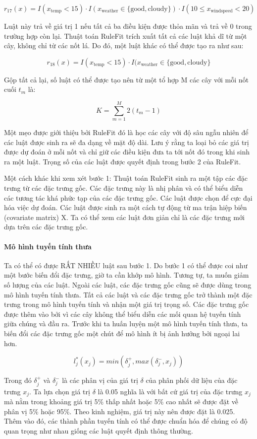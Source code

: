 $$r_{17}(x)=I(x_{\text{temp}}<15)\cdot{}I(x_{\text{weather}}\in\{\text{good},\text{cloudy}\})\cdot{}I(10\leq{}x_{\text{windspeed}}<20)$$

Luật này trả về giá trị 1 nếu tất cả ba điều kiện được thỏa mãn và trả về 0 trong trường hợp còn lại. Thuật toán RuleFit trích xuất tất cả các luật khả dĩ từ một cây, không chỉ từ các nốt lá. Do đó, một luật khác có thể được tạo ra như sau:

$$r_{18}(x)=I(x_{\text{temp}}<15)\cdot{}I(x_{\text{weather}}\in\{\text{good},\text{cloudy}\}$$

Gộp tất cả lại, số luật có thể được tạo nên từ một tổ hợp M các cây với mỗi nốt cuối $t_m$ là:

$$K=\sum_{m=1}^M2(t_m-1)$$

Một mẹo được giới thiệu bởi RuleFit đó là học các cây với độ sâu ngẫu nhiên để các luật được sinh ra sẽ đa dạng về mặt độ dài. Lưu ý rằng ta loại bỏ các giá trị được dự đoán ở mỗi nốt và chỉ giữ các điều kiện đưa ta tới nốt đó trong khi sinh ra một luật. Trọng số của các luật được quyết định trong bước 2 của RuleFit.

Một cách khác khi xem xét bước 1: Thuật toán RuleFit sinh ra một tập các đặc trưng từ các đặc trưng gốc. Các đặc trưng này là nhị phân và có thể biểu diễn các tương tác khá phức tạp của các đặc trưng gốc. Các luật được chọn để cực đại hóa việc dự đoán. Các luật được sinh ra một cách tự động từ ma trận hiệp biến (covariate matrix) X. Ta có thể xem các luật đơn giản chỉ là các đặc trưng mới dựa trên các đặc trưng gốc.


\paragraph{Mô hình tuyến tính thưa}
Ta có thể có được RẤT NHIỀU luật sau bước 1. Do bước 1 có thể được coi như một bước biến đổi đặc trưng, giờ ta cần khớp mô hình. Tương tự, ta muốn giảm số lượng của các luật. Ngoài các luật, các đặc trưng gốc cũng sẽ được dùng trong mô hình tuyến tính thưa. Tất cả các luật và các đặc trưng gốc trở thành một đặc trưng trong mô hình tuyến tính và nhận một giá trị trọng số. Các đặc trưng gốc được thêm vào bởi vì các cây không thể biểu diễn các mối quan hệ tuyến tính giữa chúng và đầu ra. Trước khi ta huấn luyện một mô hình tuyến tính thưa, ta biến đổi các đặc trưng gốc một chút để mô hình ít bị ảnh hưởng bởi ngoại lai hơn.

$$l_j^*(x_j)=min(\delta_j^+,max(\delta_j^-,x_j))$$

Trong đó $\delta_j^+$ và $\delta_j^-$ là các phân vị của giá trị $\delta$ của phân phối dữ liệu của đặc trưng $x_j$. Ta lựa chọn giá trị $\delta$ là 0.05 nghĩa là với bất cứ giá trị của đặc trưng $x_j$ mà nằm trong khoảng giá trị 5\% thấp nhất hoặc 5\% cao nhất sẽ được đặt về phân vị 5\% hoặc 95\%. Theo kinh nghiệm, giá trị này nên được đặt là 0.025. Thêm vào đó, các thành phần tuyến tính có thể được chuẩn hóa để chúng có độ quan trọng như nhau giống các luật quyết định thông thường.

